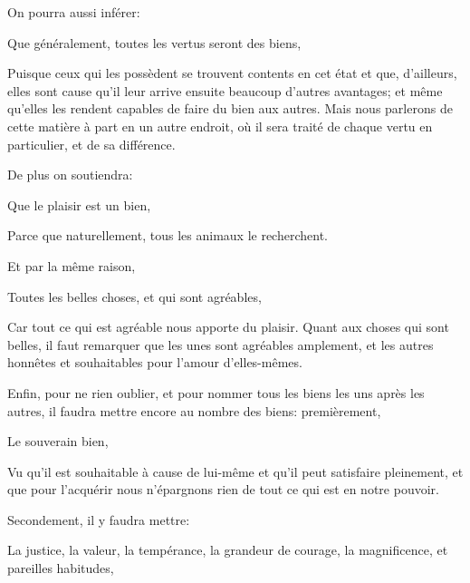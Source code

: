 \bigbreak

On pourra aussi inférer:

\begin{emphpar}
     Que généralement, toutes les vertus seront des biens,
\end{emphpar}

Puisque ceux qui les possèdent se trouvent contents en cet état et que, d'ailleurs, elles sont cause qu'il leur arrive
ensuite beaucoup d'autres avantages; et même qu'elles les rendent capables de faire du bien aux autres. Mais nous
parlerons de cette matière à part en un autre endroit, où il sera traité de chaque vertu en particulier, et de sa
différence. 

\bigbreak

De plus on soutiendra:

\begin{emphpar}
     Que le plaisir est un bien,
\end{emphpar}

Parce que naturellement, tous les animaux le recherchent.

\bigbreak

Et par la même raison,

\begin{emphpar}
     Toutes les belles choses, et qui sont agréables,
\end{emphpar}

Car tout ce qui est agréable nous apporte du plaisir. Quant aux choses qui sont belles, il faut remarquer que les unes sont
agréables amplement, et les autres honnêtes et souhaitables pour l'amour d'elles-mêmes. 

\bigbreak

Enfin, pour ne rien oublier, et pour nommer tous les biens les uns après les autres, il faudra mettre encore au nombre des
biens: premièrement,

\begin{emphpar}
     Le souverain bien,
\end{emphpar}

Vu qu'il est souhaitable à cause de lui-même et qu'il peut satisfaire pleinement, et que pour l'acquérir nous n'épargnons rien
de tout ce qui est en notre pouvoir.

\bigbreak

Secondement, il y faudra mettre:

\begin{emphpar}
     La justice, la valeur, la tempérance, la grandeur de courage, la magnificence, et pareilles habitudes,
\end{emphpar}

